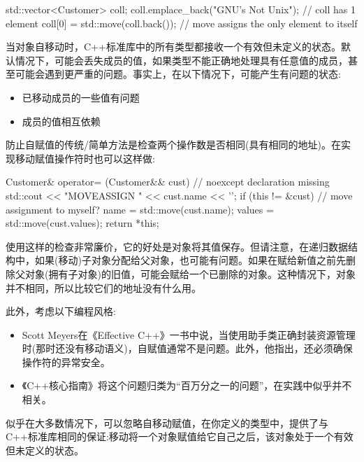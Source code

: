 \begin{codebox}[cpp]
std::vector<Customer> coll;
coll.emplace_back("GNU's Not Unix"); // coll has 1 element
coll[0] = std::move(coll.back()); // move assigns the only element to itself
\end{codebox}

当对象自移动时，C++标准库中的所有类型都接收一个有效但未定义的状态。默认情况下，可能会丢失成员的值，如果类型不能正确地处理具有任意值的成员，甚至可能会遇到更严重的问题。事实上，在以下情况下，可能产生有问题的状态:\par

\begin{itemize}
  \item 已移动成员的一些值有问题
  \item 成员的值相互依赖
\end{itemize}

防止自赋值的传统/简单方法是检查两个操作数是否相同(具有相同的地址)。在实现移动赋值操作符时也可以这样做:\par

\begin{codebox}[cpp]
Customer& operator= (Customer&& cust) { // noexcept declaration missing
  std::cout << "MOVEASSIGN " << cust.name << '\n';
  if (this != &cust) { // move assignment to myself?
    name = std::move(cust.name);
    values = std::move(cust.values);
  }
  return *this;
}
\end{codebox}

使用这样的检查非常廉价，它的好处是对象将其值保存。但请注意，在递归数据结构中，如果(移动)子对象分配给父对象，也可能有问题。如果在赋给新值之前先删除父对象(拥有子对象)的旧值，可能会赋给一个已删除的对象。这种情况下，对象并不相同，所以比较它们的地址没有什么用。\par

此外，考虑以下编程风格:\par

\begin{itemize}
  \item Scott Meyers在《Effective C++》一书中说，当使用助手类正确封装资源管理时(那时还没有移动语义)，自赋值通常不是问题。此外，他指出，还必须确保操作符的异常安全。
  \item 《C++核心指南》将这个问题归类为“百万分之一的问题”，在实践中似乎并不相关。
\end{itemize}

似乎在大多数情况下，可以忽略自移动赋值，在你定义的类型中，提供了与C++标准库相同的保证:移动将一个对象赋值给它自己之后，该对象处于一个有效但未定义的状态。\par

